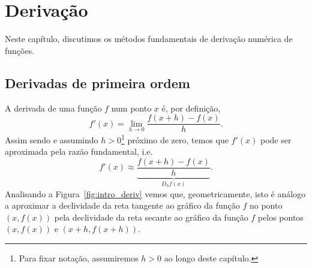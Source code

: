 
\chapter{Derivação}\label{cap_deriv}
\thispagestyle{fancy}

Neste capítulo, discutimos os métodos fundamentais de derivação numérica de funções.

\section{Derivadas de primeira ordem}\label{cap_deriv_sec_df}

A derivada de uma função $f$ num ponto $x$ é, por definição,
\begin{equation}
  f'(x) = \lim_{h\to 0} \frac{f(x+h) - f(x)}{h}.
\end{equation}
Assim sendo e assumindo $h>0$\footnote{Para fixar notação, assumiremos $h>0$ ao longo deste capítulo.} próximo de zero, temos que $f'(x)$ pode ser aproximada pela razão fundamental, i.e.
\begin{equation}\label{eq_razao_fundamental}
  f'(x) \approx \underbrace{\frac{f(x+h) - f(x)}{h}}_{D_hf(x)}.
\end{equation}
Analisando a Figura~\ref{fig:intro_deriv} vemos que, geometricamente, isto é análogo a aproximar a declividade da reta tangente ao gráfico da função $f$ no ponto $(x,f(x))$ pela declividade da reta secante ao gráfico da função $f$ pelos pontos $(x,f(x))$ e $(x+h,f(x+h))$.

